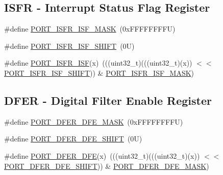 \subsection*{I\+S\+FR -\/ Interrupt Status Flag Register}
\begin{DoxyCompactItemize}
\item 
\#define \mbox{\hyperlink{group___p_o_r_t___register___masks_gabb5d188f3dfe38f0d8bbb870e81fb7e3}{P\+O\+R\+T\+\_\+\+I\+S\+F\+R\+\_\+\+I\+S\+F\+\_\+\+M\+A\+SK}}~(0x\+F\+F\+F\+F\+F\+F\+F\+F\+U)
\item 
\#define \mbox{\hyperlink{group___p_o_r_t___register___masks_ga678f290447622562272513d57eb2bf78}{P\+O\+R\+T\+\_\+\+I\+S\+F\+R\+\_\+\+I\+S\+F\+\_\+\+S\+H\+I\+FT}}~(0\+U)
\item 
\#define \mbox{\hyperlink{group___p_o_r_t___register___masks_gae1ab6f959d1aa15059efd14641caf2e7}{P\+O\+R\+T\+\_\+\+I\+S\+F\+R\+\_\+\+I\+SF}}(x)~(((uint32\+\_\+t)(((uint32\+\_\+t)(x)) $<$$<$ \mbox{\hyperlink{group___p_o_r_t___register___masks_ga678f290447622562272513d57eb2bf78}{P\+O\+R\+T\+\_\+\+I\+S\+F\+R\+\_\+\+I\+S\+F\+\_\+\+S\+H\+I\+FT}})) \& \mbox{\hyperlink{group___p_o_r_t___register___masks_gabb5d188f3dfe38f0d8bbb870e81fb7e3}{P\+O\+R\+T\+\_\+\+I\+S\+F\+R\+\_\+\+I\+S\+F\+\_\+\+M\+A\+SK}})
\end{DoxyCompactItemize}
\subsection*{D\+F\+ER -\/ Digital Filter Enable Register}
\begin{DoxyCompactItemize}
\item 
\#define \mbox{\hyperlink{group___p_o_r_t___register___masks_ga450c760a693b115dc630c8a5edb628df}{P\+O\+R\+T\+\_\+\+D\+F\+E\+R\+\_\+\+D\+F\+E\+\_\+\+M\+A\+SK}}~(0x\+F\+F\+F\+F\+F\+F\+F\+F\+U)
\item 
\#define \mbox{\hyperlink{group___p_o_r_t___register___masks_ga7bcd0509509d5a2865efab49eef02c56}{P\+O\+R\+T\+\_\+\+D\+F\+E\+R\+\_\+\+D\+F\+E\+\_\+\+S\+H\+I\+FT}}~(0\+U)
\item 
\#define \mbox{\hyperlink{group___p_o_r_t___register___masks_ga3261e250c50e71a33b4d443a6ca28c25}{P\+O\+R\+T\+\_\+\+D\+F\+E\+R\+\_\+\+D\+FE}}(x)~(((uint32\+\_\+t)(((uint32\+\_\+t)(x)) $<$$<$ \mbox{\hyperlink{group___p_o_r_t___register___masks_ga7bcd0509509d5a2865efab49eef02c56}{P\+O\+R\+T\+\_\+\+D\+F\+E\+R\+\_\+\+D\+F\+E\+\_\+\+S\+H\+I\+FT}})) \& \mbox{\hyperlink{group___p_o_r_t___register___masks_ga450c760a693b115dc630c8a5edb628df}{P\+O\+R\+T\+\_\+\+D\+F\+E\+R\+\_\+\+D\+F\+E\+\_\+\+M\+A\+SK}})
\end{DoxyCompactItemize}
